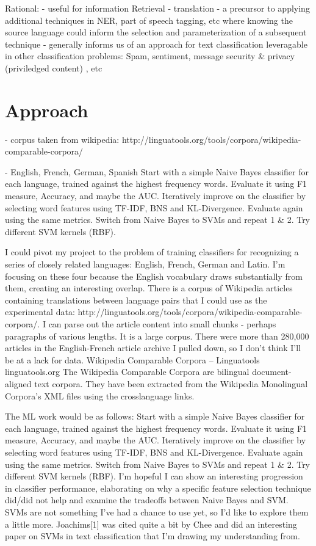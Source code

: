 \documentclass[twoside,11pt]{article}
\begin{document}
Rational:
- useful for information Retrieval
- translation
- a precursor to applying additional techniques in NER, part of speech tagging, etc where knowing the source language could inform the selection and parameterization of a subsequent technique
- generally informs us of an approach for text classification leveragable in other classification problems: Spam, sentiment, message security & privacy (priviledged content) , etc




\section{Approach}

- corpus taken from wikipedia:  http://linguatools.org/tools/corpora/wikipedia-comparable-corpora/

- English, French, German, Spanish
Start with a simple Naive Bayes classifier for each language, trained against the highest frequency words. Evaluate it using F1 measure, Accuracy, and maybe the AUC.
Iteratively improve on the classifier by selecting word features using TF-IDF, BNS and KL-Divergence.  Evaluate again using the same metrics.
Switch from Naive Bayes to SVMs and repeat 1 & 2.
Try different SVM kernels (RBF).




I could pivot my project to the problem of training classifiers for recognizing a series of closely related languages:   English, French, German and Latin.  I'm focusing on these four because the English vocabulary draws substantially from them, creating an interesting overlap. There is a corpus of Wikipedia articles containing translations between language pairs that I could use as the experimental data:  http://linguatools.org/tools/corpora/wikipedia-comparable-corpora/.  I can parse out the article content into small chunks - perhaps paragraphs of various lengths.  It is a large corpus. There were more than 280,000 articles in the English-French article archive I pulled down, so I don't think I'll be at a lack for data.
Wikipedia Comparable Corpora – Linguatools
linguatools.org
The Wikipedia Comparable Corpora are bilingual document-aligned text corpora. They have been extracted from the Wikipedia Monolingual Corpora’s XML files using the crosslanguage links.



The ML work would be as follows:
Start with a simple Naive Bayes classifier for each language, trained against the highest frequency words. Evaluate it using F1 measure, Accuracy, and maybe the AUC.
Iteratively improve on the classifier by selecting word features using TF-IDF, BNS and KL-Divergence.  Evaluate again using the same metrics.
Switch from Naive Bayes to SVMs and repeat 1 & 2.
Try different SVM kernels (RBF).
I'm hopeful I can show an interesting progression in classifier performance, elaborating on why a specific feature selection technique did/did not help and examine the tradeoffs between Naive Bayes and SVM.  SVMs are not something I've had a chance to use yet, so I'd like to explore them a little more. Joachims[1] was cited quite a bit by Chee and did an interesting paper on SVMs in text classification that I'm drawing my understanding from.
\end{document}
